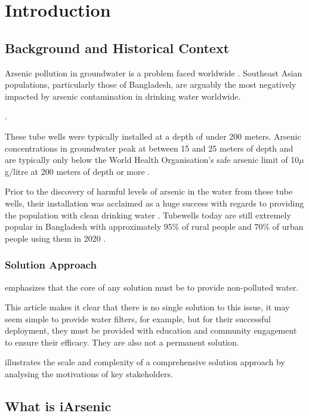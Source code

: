 \chapter{Introduction}

\section{Background and Historical Context}

Arsenic pollution in groundwater is a problem faced worldwide \parencite{khan2014groundwater}. Southeast Asian populations, particularly those of Bangladesh, are arguably the most negatively impacted by arsenic contamination in drinking water worldwide. 

 \parencite{Smith2000}. 

These tube wells were typically installed at a depth of under 200 meters. Arsenic concentrations in groundwater peak at between 15 and 25 meters of depth and are typically only below the World Health Organisation's safe arsenic limit of 10$\mu$g/litre \parencite{WHO2003} at 200 meters of depth or more \parencite{Chakraborti2010}. 

Prior to the discovery of harmful levels of arsenic in the water from these tube wells, their installation was acclaimed as a huge success with regards to providing the population with clean drinking water \parencite{khan2014groundwater}. Tubewells today are still extremely popular in Bangladesh with approximately 95\% of rural people and 70\% of urban people using them in 2020 \parencite{Ghosh2020}.

\subsection{Solution Approach}

\cite{Smith2000} emphasizes that the core of any solution must be to provide non-polluted water.

This article makes it clear that there is no single solution to this issue, it may seem simple to provide water filters, for example, but for their successful deployment, they must be provided with education and community engagement to ensure their efficacy. They are also not a permanent solution. 

\cite{Khan2014} illustrates the scale and complexity of a comprehensive solution approach by analysing the motivations of key stakeholders.

\section{What is iArsenic}

